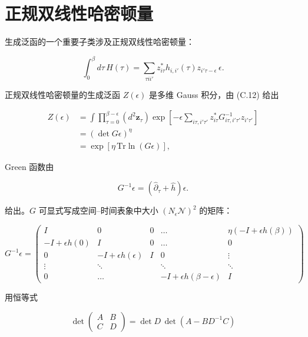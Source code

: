 \section{正规双线性哈密顿量}

生成泛函的一个重要子类涉及正规双线性哈密顿量：

\begin{equation*}
\int_ {0} ^ {\beta} d \tau \, H ( \tau ) = \sum_{\tau ii '} z_{i \tau} ^ {*} h_{i, i '} ( \tau ) z_{i ' \tau - \epsilon} \, \epsilon .
\tag{D.10}
\end{equation*}

正规双线性哈密顿量的生成泛函 $Z(\epsilon)$ 是多维 Gauss 积分，由 (C.12) 给出

\begin{align*}
Z ( \epsilon ) & = \int \prod_{\tau = 0} ^ {\beta - \epsilon} \left( d ^ {2} \mathbf {z} _ {\tau} \right) \exp \left[ - \epsilon \sum_{i \tau, i ' \tau '} z_{i \tau} ^ {*} G_{i \tau, i ' \tau '} ^ {- 1} z_{i ' \tau '} \right]\\
& = \left( \det G \epsilon \right) ^ {\eta}\\
& = \exp \left[ \eta \, \mathrm{Tr} \ln \left( G \epsilon \right) \right] ,
\tag{D.11}
\end{align*}

Green 函数由

\begin{equation*}
G ^ {- 1} \epsilon = \left( \hat {\partial} _ {\tau} + \hat {h} \right) \epsilon .
\tag{D.12}
\end{equation*}

给出。$G$ 可显式写成空间--时间表象中大小 $(N_{\epsilon}\mathcal{N})^2$ 的矩阵：

\begin{equation*}
G ^ {- 1} \epsilon = \left( \begin{array}{ccccc} I & 0 & 0 & \ldots & \eta \left( - I + \epsilon h ( \beta ) \right) \\ - I + \epsilon h ( 0 ) & I & 0 & \ldots & 0 \\ 0 & - I + \epsilon h ( \epsilon ) & I & 0 & \vdots \\ \vdots & \ddots & & \ddots & \ddots \\ 0 & \ldots & & - I + \epsilon h ( \beta - \epsilon ) & I \end{array} \right)
\tag{D.13}
\end{equation*}

用恒等式

\begin{equation*}
\det \left( \begin{array}{cc} A & B \\ C & D \end{array} \right) = \det D \, \det \left( A - B D ^ {- 1} C \right)
\tag{D.14}
\end{equation*}

